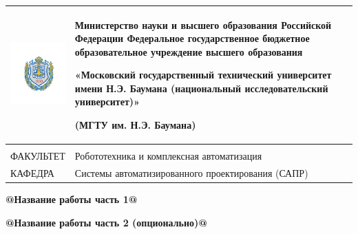 \documentclass[12pt, a4paper]{article}
\makeatletter
\newcommand{\Faculty}{Робототехника и комплексная автоматизация}
\newcommand{\Department}{Системы автоматизированного проектирования (САПР)}
\newcommand{\TitleText}{@Название работы часть 1@}
\newcommand{\Title}{{\Huge \textbf{\TitleText}}}
\newcommand{\SubTitleText}{@Название работы часть 2 (опционально)@}
\newcommand{\SubTitle}{{\LARGE \textbf{\SubTitleText}}}
\makeatother
\begin{document}
	\thispagestyle{empty}
	\begin{tabular}{m{0.15\linewidth}m{0.85\linewidth}}
	\centering
	\includegraphics[scale=0.07]{static/bmstu.pdf} &
	{\centering
	Министерство науки и высшего образования Российской Федерации
	Федеральное государственное бюджетное образовательное учреждение
	высшего образования
	
	«Московский государственный технический университет
	имени Н.Э. Баумана
	(национальный исследовательский университет)»
	
	(МГТУ им. Н.Э. Баумана)
	
    } \\
	\hline
	\multicolumn{1}{p{0.15\textwidth}}{} & \multicolumn{1}{p{0.85\textwidth}}{} \\
	\multicolumn{1}{p{0.15\textwidth}}{ФАКУЛЬТЕТ}	&	\multicolumn{1}{p{0.85\textwidth}}{\Faculty}	\\
	\multicolumn{1}{p{0.15\textwidth}}{КАФЕДРА}	&	\multicolumn{1}{p{0.85\textwidth}}{\Department}	\\
	\end{tabular}
\vfil

\begin{center}
	\Title
	
	\SubTitle
\end{center}
\end{document}
